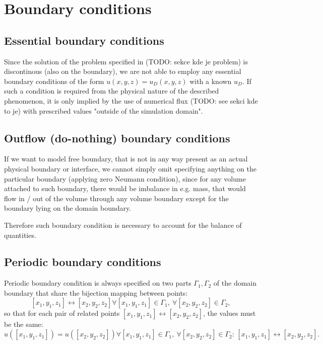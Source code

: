 \section{Boundary conditions}

\subsection{Essential boundary conditions}
Since the solution of the problem specified in (TODO: sekce kde je problem) is discontinous (also on the boundary), we are not able to employ any essential boundary conditions of the form $u\left(x, y, z\right) = u_D\left(x, y, z\right)$ with a known $u_D$.
If such a condition is required from the physical nature of the described phenomenon, it is only implied by the use of numerical flux (TODO: see sekci kde to je) with prescribed values "outside of the simulation domain".


\subsection{Outflow (do-nothing) boundary conditions}
If we want to model free boundary, that is not in any way present as an actual physical boundary or interface, we cannot simply omit specifying anything on the particular boundary (applying zero Neumann condition), since for any volume attached to such boundary, there would be imbalance in e.g. mass, that would flow in / out of the volume through any volume boundary except for the boundary lying on the domain boundary.

Therefore such boundary condition is necessary to account for the balance of quantities.


\subsection{Periodic boundary conditions}
Periodic boundary condition is always specified on two parts $\Gamma_1, \Gamma_2$ of the domain boundary that share the bijection mapping between points:
$$
\left[x_1, y_1, z_1\right] \leftrightarrow \left[x_2, y_2, z_2\right] \forall \left[x_1, y_1, z_1\right] \in \Gamma_1,\ \forall \left[x_2, y_2, z_2\right] \in \Gamma_2,
$$
so that for each pair of related points $\left[x_1, y_1, z_1\right] \leftrightarrow \left[x_2, y_2, z_2\right]$, the values must be the same:
$$
u\left(\left[x_1, y_1, z_1\right]\right) = u\left(\left[x_2, y_2, z_2\right]\right) \forall \left[x_1, y_1, z_1\right] \in \Gamma_1,\ \forall \left[x_2, y_2, z_2\right] \in \Gamma_2:\, \left[x_1, y_1, z_1\right] \leftrightarrow \left[x_2, y_2, z_2\right].
$$
